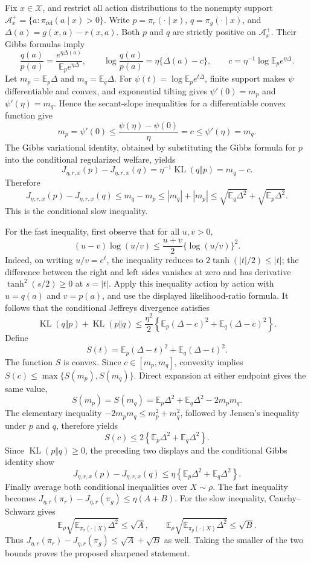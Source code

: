 Fix \(x\in\mathcal X\), and restrict all action distributions to the nonempty support \(\mathcal A_x^+=\{a:\pi_{\mathrm{ref}}(a\mid x)>0\}\). Write \(p=\pi_r(\cdot\mid x)\), \(q=\pi_g(\cdot\mid x)\), and \(\Delta(a)=g(x,a)-r(x,a)\). Both \(p\) and \(q\) are strictly positive on \(\mathcal A_x^+\). Their Gibbs formulas imply
\[
\frac{q(a)}{p(a)}=\frac{e^{\eta\Delta(a)}}{\mathbb E_p e^{\eta\Delta}},
\qquad
\log\frac{q(a)}{p(a)}=\eta\{\Delta(a)-c\},
\qquad
c=\eta^{-1}\log\mathbb E_p e^{\eta\Delta}.
\]
Let \(m_p=\mathbb E_p\Delta\) and \(m_q=\mathbb E_q\Delta\). For \(\psi(t)=\log\mathbb E_p e^{t\Delta}\), finite support makes \(\psi\) differentiable and convex, and exponential tilting gives \(\psi'(0)=m_p\) and \(\psi'(\eta)=m_q\). Hence the secant-slope inequalities for a differentiable convex function give
\[
m_p=\psi'(0)\le\frac{\psi(\eta)-\psi(0)}{\eta}=c\le\psi'(\eta)=m_q.
\]
The Gibbs variational identity, obtained by substituting the Gibbs formula for \(p\) into the conditional regularized welfare, yields
\[
J_{\eta,r,x}(p)-J_{\eta,r,x}(q)
=\eta^{-1}\operatorname{KL}(q\Vert p)
=m_q-c.
\]
Therefore
\[
J_{\eta,r,x}(p)-J_{\eta,r,x}(q)
\le m_q-m_p
\le |m_q|+|m_p|
\le\sqrt{\mathbb E_q\Delta^2}+\sqrt{\mathbb E_p\Delta^2}.
\]
This is the conditional slow inequality.

For the fast inequality, first observe that for all \(u,v>0\),
\[
(u-v)\log(u/v)\le\frac{u+v}{2}\{\log(u/v)\}^2.
\]
Indeed, on writing \(u/v=e^t\), the inequality reduces to \(2\tanh(|t|/2)\le |t|\); the difference between the right and left sides vanishes at zero and has derivative \(\tanh^2(s/2)\ge0\) at \(s=|t|\). Apply this inequality action by action with \(u=q(a)\) and \(v=p(a)\), and use the displayed likelihood-ratio formula. It follows that the conditional Jeffreys divergence satisfies
\[
\operatorname{KL}(q\Vert p)+\operatorname{KL}(p\Vert q)
\le\frac{\eta^2}{2}\left\{
\mathbb E_p(\Delta-c)^2+\mathbb E_q(\Delta-c)^2
\right\}.
\]
Define
\[
S(t)=\mathbb E_p(\Delta-t)^2+\mathbb E_q(\Delta-t)^2.
\]
The function \(S\) is convex. Since \(c\in[m_p,m_q]\), convexity implies \(S(c)\le\max\{S(m_p),S(m_q)\}\). Direct expansion at either endpoint gives the same value,
\[
S(m_p)=S(m_q)
=\mathbb E_p\Delta^2+\mathbb E_q\Delta^2-2m_pm_q.
\]
The elementary inequality \(-2m_pm_q\le m_p^2+m_q^2\), followed by Jensen's inequality under \(p\) and \(q\), therefore yields
\[
S(c)
\le2\left\{\mathbb E_p\Delta^2+\mathbb E_q\Delta^2\right\}.
\]
Since \(\operatorname{KL}(p\Vert q)\ge0\), the preceding two displays and the conditional Gibbs identity show
\[
J_{\eta,r,x}(p)-J_{\eta,r,x}(q)
\le\eta\left\{\mathbb E_p\Delta^2+\mathbb E_q\Delta^2\right\}.
\]
Finally average both conditional inequalities over \(X\sim\rho\). The fast inequality becomes \(J_{\eta,r}(\pi_r)-J_{\eta,r}(\pi_g)\le\eta(A+B)\). For the slow inequality, Cauchy--Schwarz gives
\[
\mathbb E_\rho\sqrt{\mathbb E_{\pi_r(\cdot\mid X)}\Delta^2}\le\sqrt A,
\qquad
\mathbb E_\rho\sqrt{\mathbb E_{\pi_g(\cdot\mid X)}\Delta^2}\le\sqrt B.
\]
Thus \(J_{\eta,r}(\pi_r)-J_{\eta,r}(\pi_g)\le\sqrt A+\sqrt B\) as well. Taking the smaller of the two bounds proves the proposed sharpened statement.